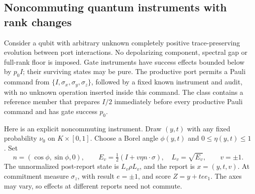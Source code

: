 \subsection*{Noncommuting quantum instruments with rank changes}
Consider a qubit with arbitrary unknown completely positive trace-preserving evolution between port interactions. No depolarizing component, spectral gap or full-rank floor is imposed. Gate instruments have success effects bounded below by $p_0I$; their surviving states may be pure. The productive port permits a Pauli command from $\{I,\sigma_x,\sigma_y,\sigma_z\}$, followed by a fixed known instrument and audit, with no unknown operation inserted inside this command. The class contains a reference member that prepares $I/2$ immediately before every productive Pauli command and has gate success $p_0$.

Here is an explicit noncommuting instrument. Draw $(y,t)$ with any fixed probability $\nu_0$ on $K\times[0,1]$. Choose a Borel angle $\phi(y,t)$ and $0\le\eta(y,t)\le1$. Set
\[
 n=(\cos\phi,\sin\phi,0),\qquad
 E_v=\tfrac12(I+v\eta n\cdot\sigma),\quad L_v=\sqrt{E_v},\qquad v=\pm1.
\]
The unnormalized post-report state is $L_v\rho L_v$, and the report is $x=(y,t,v)$. At commitment measure $\sigma_z$, with result $e=\pm1$, and score $Z=y+te e_1$. The axes may vary, so effects at different reports need not commute.

